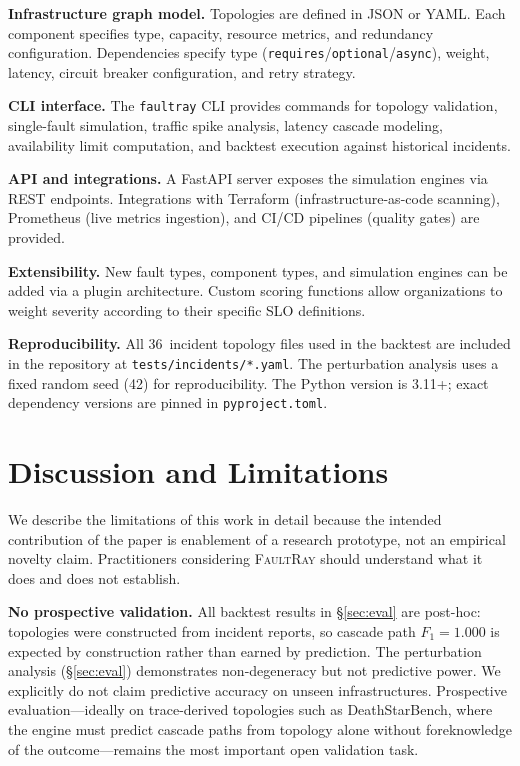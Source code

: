 \documentclass[10pt,twocolumn]{article}
\begin{document}
\textbf{Infrastructure graph model.}
Topologies are defined in JSON or YAML.  Each component specifies type,
capacity, resource metrics, and redundancy configuration.
Dependencies specify type
(\texttt{requires}/\texttt{optional}/\texttt{async}), weight, latency,
circuit breaker configuration, and retry strategy.

\textbf{CLI interface.}
The \texttt{faultray} CLI provides commands for topology validation,
single-fault simulation, traffic spike analysis, latency cascade
modeling, availability limit computation, and backtest execution against
historical incidents.

\textbf{API and integrations.}
A FastAPI server exposes the simulation engines via REST endpoints.
Integrations with Terraform (infrastructure-as-code scanning),
Prometheus (live metrics ingestion), and CI/CD pipelines (quality gates)
are provided.

\textbf{Extensibility.}
New fault types, component types, and simulation engines can be
added via a plugin architecture.  Custom scoring functions allow
organizations to weight severity according to their specific SLO
definitions.

\textbf{Reproducibility.}
All 36~incident topology files used in the backtest are included
in the repository at \texttt{tests/incidents/*.yaml}. The
perturbation analysis uses a fixed random seed (42) for
reproducibility. The Python version is 3.11+; exact dependency
versions are pinned in \texttt{pyproject.toml}.

\section{Discussion and Limitations}\label{sec:discussion}

We describe the limitations of this work in detail because the
intended contribution of the paper is enablement of a research
prototype, not an empirical novelty claim. Practitioners considering
\textsc{FaultRay} should understand what it does and does not
establish.

\textbf{No prospective validation.}
All backtest results in \S\ref{sec:eval} are post-hoc: topologies
were constructed from incident reports, so cascade path $F_1 = 1.000$
is expected by construction rather than earned by prediction. The
perturbation analysis (\S\ref{sec:eval}) demonstrates non-degeneracy
but not predictive power. We explicitly do not claim predictive
accuracy on unseen infrastructures. Prospective evaluation---ideally
on trace-derived topologies such as DeathStarBench, where the engine
must predict cascade paths from topology alone without foreknowledge
of the outcome---remains the most important open validation task.
\end{document}
